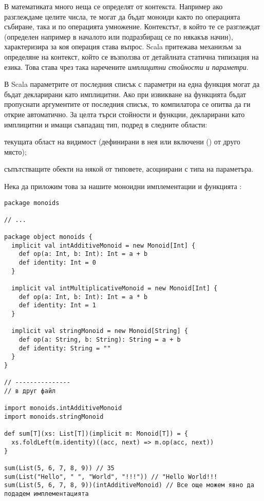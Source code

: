 В математиката много неща се определят от контекста. Например ако разглеждаме целите числа, те могат да бъдат моноиди както по операцията събиране, така и по операцията умножение. Контекстът, в който те се разглеждат (определен например в началото или подразбиращ се по някакъв начин), характеризира за коя операция става въпрос. Scala притежава механизъм за определяне на контекст, който се възползва от детайлната статична типизация на езика. Това става чрез така наречените \emph{имплицитни стойности и параметри}.

В Scala параметрите от последния списък с параметри на една функция могат да бъдат декларирани като имплицитни. Ако при извикване на функцията бъдат пропуснати аргументите от последния списък, то компилатора се опитва да ги открие автоматично. За целта търси стойности и функции, декларирани като имплицитни и имащи съвпадащ тип, подред в следните области:

\begin{enumerate*}
  \item текущата област на видимост (дефинирани в нея или включени () от друго място);
  \item съпътстващите обекти на някой от типовете, асоциирани с типа на параметъра.
\end{enumerate*}

Нека да приложим това за нашите моноидни имплементации и функцията :

\begin{lstlisting}[texcl=true]
package monoids

// ...

package object monoids {
  implicit val intAdditiveMonoid = new Monoid[Int] {
    def op(a: Int, b: Int): Int = a + b
    def identity: Int = 0
  }
  
  implicit val intMultiplicativeMonoid = new Monoid[Int] {
    def op(a: Int, b: Int): Int = a * b
    def identity: Int = 1
  }
  
  implicit val stringMonoid = new Monoid[String] {
    def op(a: String, b: String): String = a + b
    def identity: String = ""
  }
}

// ---------------
// в друг файл

import monoids.intAdditiveMonoid
import monoids.stringMonoid

def sum[T](xs: List[T])(implicit m: Monoid[T]) = {
  xs.foldLeft(m.identity)((acc, next) => m.op(acc, next))
}

sum(List(5, 6, 7, 8, 9)) // 35
sum(List("Hello", " ", "World", "!!!")) // "Hello World!!!
sum(List(5, 6, 7, 8, 9))(intAdditiveMonoid) // Все още можем явно да подадем имплементацията
\end{lstlisting}

